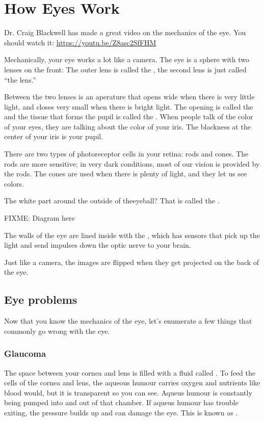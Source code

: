 \chapter{How Eyes Work}

Dr. Craig Blackwell has made a great video on the mechanics of the
eye. You should watch it: \url{https://youtu.be/Z8asc2SfFHM}

Mechanically, your eye works a lot like a camera.  The eye is a sphere
with two lenses on the front: The outer lens is called the , the
second lens is just called ``the lens.''

Between the two lenses is an aperature that opens wide when there is
very little light, and closes very small when there is bright light.
The opening is called the  and the tissue that forms
the pupil is called the .  When people talk of the color
of your eyes, they are talking about the color of your iris. The
blackness at the center of your iris is your pupil.

There are two types of photoreceptor cells in your retina: rods and
cones. The rods are more sensitive; in very dark conditions, most of
our vision is provided by the rods. The cones are used when there is
plenty of light, and they let us see colors.

The white part around the outside of theeyeball? That is called the
.

FIXME: Diagram here

The walls of the eye are lined inside with the , which has
 sensors that pick up the light and send impulses down the optic
nerve to your brain.

Just like a camera, the images are flipped when they get projected on
the back of the eye.

\section{Eye problems}

Now that you know the mechanics of the eye, let's enumerate a few
things that commonly go wrong with the eye.

\subsection{Glaucoma}

The space between your cornea and lens is filled with a fluid called
. To feed the cells of the cornea and lens,
the aqueous humour carries oxygen and nutrients like blood would, but
it is transparent so you can see. Aqueus humour is constantly being
pumped into and out of that chamber.  If aqueus humour has trouble
exiting, the pressure builds up and can damage the eye. This is known
as .

